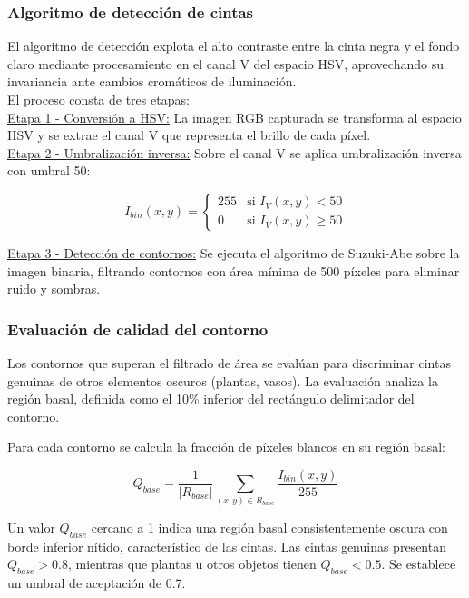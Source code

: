 \subsubsection{Algoritmo de detección de cintas}

El algoritmo de detección explota el alto contraste entre la cinta negra y el fondo claro mediante procesamiento en el canal V del espacio HSV, aprovechando su invariancia ante cambios cromáticos de iluminación.\\

El proceso consta de tres etapas:\\

\underline{Etapa 1 - Conversión a HSV:} La imagen RGB capturada se transforma al espacio HSV y se extrae el canal V que representa el brillo de cada píxel.\\

\underline{Etapa 2 - Umbralización inversa:} Sobre el canal V se aplica umbralización inversa con umbral 50:

\begin{equation}
I_{bin}(x,y) = \begin{cases}
255 & \text{si } I_V(x,y) < 50 \\
0 & \text{si } I_V(x,y) \geq 50
\end{cases}
\end{equation}

\underline{Etapa 3 - Detección de contornos:} Se ejecuta el algoritmo de Suzuki-Abe sobre la imagen binaria, filtrando contornos con área mínima de 500 píxeles para eliminar ruido y sombras.

\subsubsection{Evaluación de calidad del contorno}

Los contornos que superan el filtrado de área se evalúan para discriminar cintas genuinas de otros elementos oscuros (plantas, vasos). La evaluación analiza la región basal, definida como el 10\% inferior del rectángulo delimitador del contorno.

Para cada contorno se calcula la fracción de píxeles blancos en su región basal:

\begin{equation}
Q_{base} = \frac{1}{|R_{base}|} \sum_{(x,y) \in R_{base}} \frac{I_{bin}(x,y)}{255}
\end{equation}

Un valor $Q_{base}$ cercano a 1 indica una región basal consistentemente oscura con borde inferior nítido, característico de las cintas. Las cintas genuinas presentan $Q_{base} > 0.8$, mientras que plantas u otros objetos tienen $Q_{base} < 0.5$. Se establece un umbral de aceptación de 0.7.

